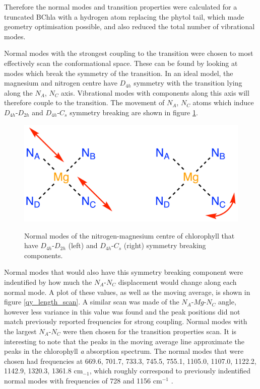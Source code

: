 Therefore the normal modes and transition properties were calculated for a truncated 
BChla with a hydrogen atom replacing the phytol tail, which made geometry optimisation
possible, and also reduced the total number of vibrational modes.

Normal modes with the strongest coupling to the \Qy transition were chosen to most
effectively scan the conformational space. These can be found by looking at modes
which break the symmetry of the \Qy transition. In an ideal model, the magnesium
and nitrogen centre have $D_{4h}$ symmetry with the \Qy transition lying along 
the $N_A$, $N_C$ axis. Vibrational modes with components along this axis will
therefore couple to the transition. The movement of $N_A$, $N_C$ atoms which induce
$D_{4h}$-$D_{2h}$ and $D_{4h}$-$C_{s}$ symmetry breaking are shown in figure \ref{fig:D4_sym_breaking}.

\begin{figure}[h]
    \centering
    \includegraphics[scale=1.5]{chapters/chapter03/D4h_symmetry.png}
    \label{fig:D4_sym_breaking}
    \caption{Normal modes of the nitrogen-magnesium centre of chlorophyll that have
    $D_{4h}$-$D_{2h}$ (left) and $D_{4h}$-$C_{s}$ (right) symmetry breaking components.}
\end{figure}

Normal modes that would also have this symmetry breaking component were indentified
by how much the $N_A$-$N_C$ displacement would change along each normal mode. A plot of these
values, as well as the moving average, is shown in figure \ref{qy_length_scan}.
A similar scan was made of the $N_A$-$Mg$-$N_C$ angle, however less variance in
this value was found and the peak positions did not match previously reported frequencies
for strong coupling. Normal modes with the largest $N_A$-$N_C$ were then chosen 
for the transition properties scan.  It is interesting to note that the peaks in
the moving average line approximate the peaks in the chlorophyll \emph{a} absorption 
spectrum. The normal modes that were chosen had frequencies at 669.6, 701.7, 733.3,
745.5, 755.1, 1105.0, 1107.0, 1122.2, 1142.9, 1320.3, 1361.8 $\text{cm}_{-1}$, which
roughly correspond to previously indentified normal modes with frequencies of 728
and 1156 $\text{cm}^{-1}$ \cite{Kim2020}.

